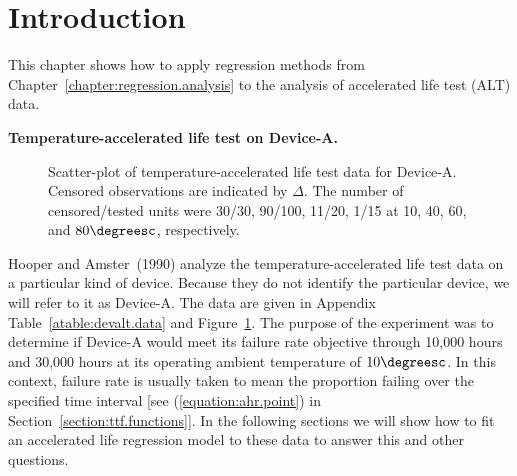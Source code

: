 \section{Introduction}
This chapter shows how to apply regression methods
from Chapter~\ref{chapter:regression.analysis} to the analysis
of accelerated life test (ALT) data.
\begin{example}{\bf Temperature-accelerated life test on Device-A.}
\label{example:devicea.data}
\begin{figure}
\caption{Scatter-plot of temperature-accelerated 
life test data for Device-A. Censored observations are indicated by
$\Delta$. The number of censored/tested units were 30/30, 90/100,
11/20, 1/15 at 10, 40, 60, and $80\degreesc$, respectively.}
\label{figure:devalt.weib.raltplot.ps}
\end{figure}
Hooper and Amster~(1990) analyze the temperature-accelerated life test
data on a particular kind of device. Because they do not identify the
particular device, we will refer to it as Device-A. The data are given
in Appendix Table~\ref{atable:devalt.data} and
Figure~\ref{figure:devalt.weib.raltplot.ps}.  The purpose of the
experiment was to determine if Device-A would meet its failure rate
objective through 10,000 hours and 30,000 hours at its operating
ambient temperature of $10\degreesc$. In this context, failure rate is
usually taken to mean the proportion failing over the specified time
interval [see (\ref{equation:ahr.point}) in
Section~\ref{section:ttf.functions}]. In the following sections we
will show how to fit an accelerated life regression model to these
data to answer this and other questions.
\end{example}
